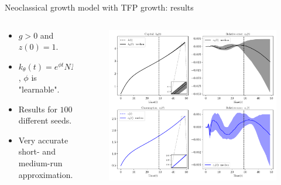 \documentclass[aspectratio=169,10pt]{beamer}
\begin{document}
\begin{frame}{Neoclassical growth model with TFP growth: results}
	\begin{columns}
		\begin{column}{0.5\textwidth}
			\begin{itemize}
				\item $g>0$ and $z(0) = 1$.
				\vspace{0.05in}
				\item $k_\theta(t) = e^{\phi t}
				NN_\theta(t)$, $\phi$ is "learnable".
				\vspace{0.05in}
				\item Results for $100$ different seeds.
				\vspace{0.05in}
				\item Very accurate short- and medium-run approximation.
			\end{itemize}
		\end{column}
		\begin{column}{0.5\textwidth}
			\begin{figure}[t!]
				\centering
				\includegraphics[width=\textwidth]{figs/growth_sequential_g_positive_ensemble.pdf}
				\vspace{-7mm}
			\end{figure}
		\end{column}
	\end{columns}
\end{frame}
\end{document}

